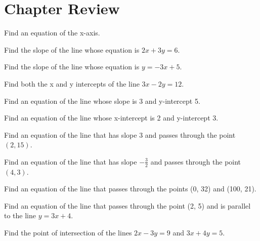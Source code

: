 \section{Chapter Review}

\begin{puzzle}
    Find an equation of the x-axis.
\end{puzzle}

\begin{puzzle}
    Find the slope of the line whose equation is \(2x + 3y = 6\).

\end{puzzle}

\begin{puzzle}
    Find the slope of the line whose equation is \(y = -3x + 5\).
\end{puzzle}

\begin{puzzle}
    Find both the x and y intercepts of the line \(3x - 2y = 12\).
\end{puzzle}

\begin{puzzle}
    Find an equation of the line whose slope is 3 and y-intercept 5.
\end{puzzle}

\begin{puzzle}
    Find an equation of the line whose x-intercept is 2 and y-intercept 3.
\end{puzzle}

\begin{puzzle}
    Find an equation of the line that has slope 3 and passes through the point \((2, 15)\).
\end{puzzle}

\begin{puzzle}
    Find an equation of the line that has slope \(-\frac{3}{2}\) and passes through the point \((4, 3)\).
\end{puzzle}

\begin{puzzle}
    Find an equation of the line that passes through the points (0, 32) and (100, 21).
\end{puzzle}

\begin{puzzle}
    Find an equation of the line that passes through the point (2, 5) and is parallel to the line \( y = 3x+4 \).
\end{puzzle}

\begin{puzzle}
    Find the point of intersection of the lines \( 2x - 3y = 9 \) and \( 3x + 4y = 5 \).
\end{puzzle}

